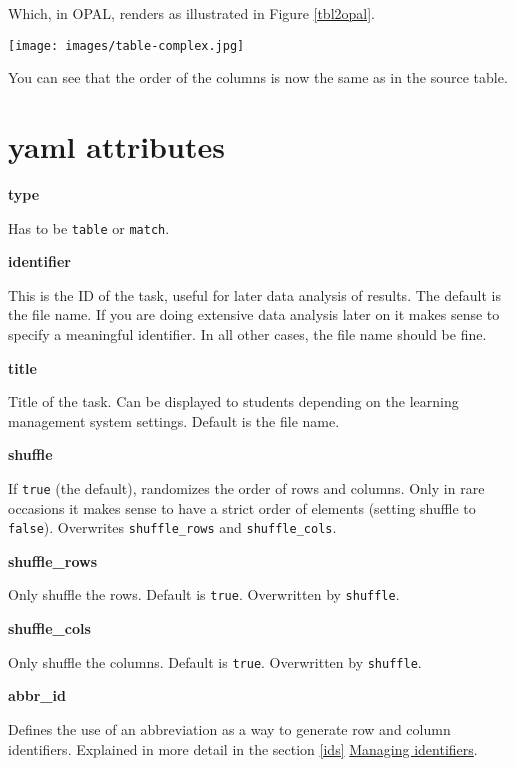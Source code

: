 \documentclass[twoside]{tufte-book}
\begin{document}
Which, in OPAL, renders as illustrated in Figure \ref{tbl2opal}.

\begin{figure*}
\centering
\texttt{[image: images/table-complex.jpg]}
\caption{\label{tbl2opal}Preview of complex table task in the learning management system OPAL}
\end{figure*}

You can see that the order of the columns is now the same as in the source table.

\section{yaml attributes}\label{yaml-attributes-7}

\noindent\textbf{type}\label{type-7}

Has to be \texttt{table} or \texttt{match}.

\noindent\textbf{identifier}\label{identifier-7}

This is the ID of the task, useful for later data analysis of results. The default is the file name. If you are doing extensive data analysis later on it makes sense to specify a meaningful identifier. In all other cases, the file name should be
fine.

\noindent\textbf{title}\label{title-7}

Title of the task. Can be displayed to students depending on the learning management system settings. Default is the file name.

\noindent\textbf{shuffle}\label{shuffle-4}

If \texttt{true} (the default), randomizes the order of rows and columns. Only in rare occasions it makes sense to have a strict order of elements (setting shuffle to \texttt{false}). Overwrites \texttt{shuffle\_rows} and \texttt{shuffle\_cols}.

\noindent\textbf{shuffle\_rows}\label{shuffle_rows}

Only shuffle the rows. Default is \texttt{true}. Overwritten by \texttt{shuffle}.

\noindent\textbf{shuffle\_cols}\label{shuffle_cols}

Only shuffle the columns. Default is \texttt{true}. Overwritten by \texttt{shuffle}.

\noindent\textbf{abbr\_id}\label{abbr_id-1}

Defines the use of an abbreviation as a way to generate row and column identifiers. Explained in more detail in the section \ref{ids} \hyperref[ids]{Managing identifiers}.
\end{document}
